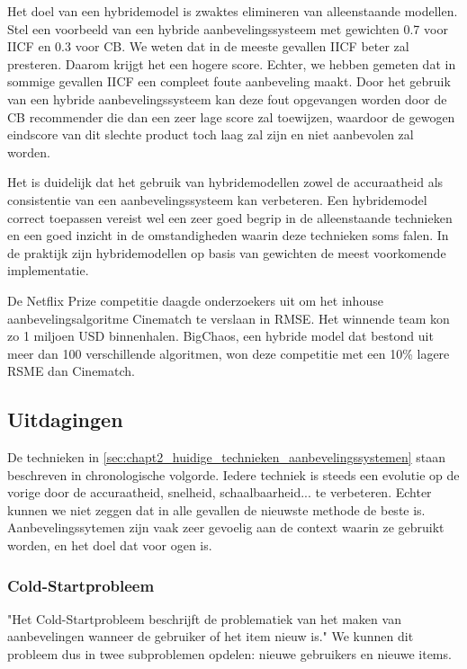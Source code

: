 Het doel van een hybridemodel is zwaktes elimineren van alleenstaande modellen. Stel een voorbeeld van een hybride aanbevelingssysteem met gewichten 0.7 voor IICF en 0.3 voor CB. We weten dat in de meeste gevallen IICF beter zal presteren. Daarom krijgt het een hogere score. Echter, we hebben gemeten dat in sommige gevallen IICF een compleet foute aanbeveling maakt. Door het gebruik van een hybride aanbevelingssysteem kan deze fout opgevangen worden door de CB recommender die dan een zeer lage score zal toewijzen, waardoor de gewogen eindscore van dit slechte product toch laag zal zijn en niet aanbevolen zal worden.

Het is duidelijk dat het gebruik van hybridemodellen zowel de accuraatheid als consistentie van een aanbevelingssysteem kan verbeteren. Een hybridemodel correct toepassen vereist wel een zeer goed begrip in de alleenstaande technieken en een goed inzicht in de omstandigheden waarin deze technieken soms falen. In de praktijk zijn hybridemodellen op basis van gewichten de meest voorkomende implementatie. \cite{hybrid_recsys_literature_overview}

De Netflix Prize competitie daagde onderzoekers uit om het inhouse aanbevelingsalgoritme Cinematch te verslaan in RMSE. Het winnende team kon zo 1 miljoen USD binnenhalen. BigChaos, een hybride model dat bestond uit meer dan 100 verschillende algoritmen, won deze competitie met een  10\% lagere RSME dan Cinematch. \cite{netflix_hybrid}

\subsection{Uitdagingen}
De technieken in \autoref{sec:chapt2_huidige_technieken_aanbevelingssystemen} staan beschreven in chronologische volgorde. Iedere techniek is steeds een evolutie op de vorige door de accuraatheid, snelheid, schaalbaarheid... te verbeteren. Echter kunnen we niet zeggen dat in alle gevallen de nieuwste methode de beste is. Aanbevelingssytemen zijn vaak zeer gevoelig aan de context waarin ze gebruikt worden, en het doel dat voor ogen is.


\subsubsection{Cold-Startprobleem}
\label{sec:chapt2_cold_start}
"Het Cold-Startprobleem beschrijft de problematiek van het maken van aanbevelingen wanneer de gebruiker of het item nieuw is." \cite{coldstart_cf} We kunnen dit probleem dus in twee subproblemen opdelen: nieuwe gebruikers en nieuwe items.

